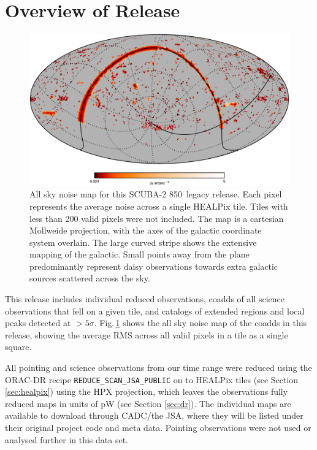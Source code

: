 \documentclass[twocolumn]{aastex6}
\newcommand{\um}{\micron}
\begin{document}
\section{Overview of Release}
\begin{figure}
  \centering
  \includegraphics{mollweide-average-noise-galacticaxes-crop}
  \caption{All sky noise map for this SCUBA-2 850\,\um{} legacy
    release. Each pixel represents the average noise across a single
    HEALPix tile. Tiles with less than 200 valid pixels were not
    included. The map is a cartesian Mollweide projection, with the
    axes of the galactic coordinate system overlain. The large curved
    stripe shows the extensive mapping of the galactic. Small points
    away from the plane predominantly represent daisy observations
    towards extra galactic sources scattered across the sky.}
  \label{fig:noise-mollweide}
\end{figure}

This release includes individual reduced observations, coadds of all
science observations that fell on a given tile, and catalogs of
extended regions and local peaks detected at
$>5\sigma$. Fig.\,\ref{fig:noise-mollweide} shows the all sky noise map
of the coadds in this release, showing the average RMS across all
valid pixels in a tile as a single square.

All pointing and science observations from our time range were reduced
using the ORAC-DR recipe \texttt{REDUCE\_SCAN\_JSA\_PUBLIC} on to
HEALPix tiles (see Section \ref{sec:healpix}) using the HPX
projection, which leaves the observations fully reduced maps in units
of pW (see Section \ref{sec:dr}). The individual maps are available to
download through CADC/the JSA, where they will be listed under their
original project code and meta data. Pointing observations were not
used or analysed further in this data set.
\end{document}

